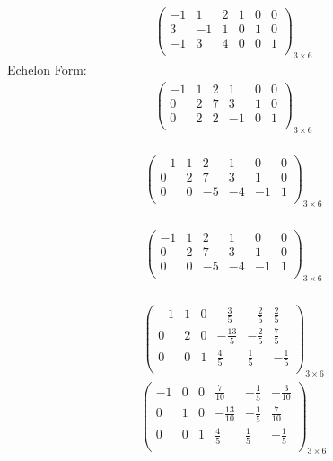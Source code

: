 \documentclass{article}
\begin{document}
\begin{align*}
\left(
\begin{array}{ccc|ccc}
-1 & 1 & 2 & 1 & 0 & 0\\
3 & -1 & 1 & 0 & 1 & 0\\
-1 & 3 & 4 & 0 & 0 & 1\\
\end{array}
\right)_{3\times 6}
\end{align*}
Echelon Form:\\
\begin{align*}
\left(
\begin{array}{ccc|ccc}
-1 & 1 & 2 & 1 & 0 & 0\\
0 & 2 & 7 & 3 & 1 & 0\\
0 & 2 & 2 & -1 & 0 & 1\\
\end{array}
\right)_{3\times 6}
\end{align*}
\\
\begin{align*}
\left(
\begin{array}{ccc|ccc}
-1 & 1 & 2 & 1 & 0 & 0\\
0 & 2 & 7 & 3 & 1 & 0\\
0 & 0 & -5 & -4 & -1 & 1\\
\end{array}
\right)_{3\times 6}
\end{align*}
\\
\begin{align*}
\left(
\begin{array}{ccc|ccc}
-1 & 1 & 2 & 1 & 0 & 0\\
0 & 2 & 7 & 3 & 1 & 0\\
0 & 0 & -5 & -4 & -1 & 1\\
\end{array}
\right)_{3\times 6}
\end{align*}
\\
\begin{align*}
\left(
\begin{array}{ccc|ccc}
-1 & 1 & 0 & -\frac{3}{5} & -\frac{2}{5} & \frac{2}{5}\\
0 & 2 & 0 & -\frac{13}{5} & -\frac{2}{5} & \frac{7}{5}\\
0 & 0 & 1 & \frac{4}{5} & \frac{1}{5} & -\frac{1}{5}\\
\end{array}
\right)_{3\times 6}
\end{align*}
\begin{align*}
\left(
\begin{array}{ccc|ccc}
-1 & 0 & 0 & \frac{7}{10} & -\frac{1}{5} & -\frac{3}{10}\\
0 & 1 & 0 & -\frac{13}{10} & -\frac{1}{5} & \frac{7}{10}\\
0 & 0 & 1 & \frac{4}{5} & \frac{1}{5} & -\frac{1}{5}\\
\end{array}
\right)_{3\times 6}
\end{align*}
\end{document}

